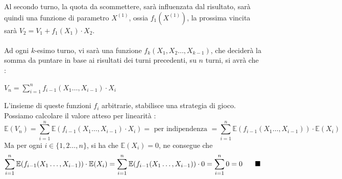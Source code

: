 \documentclass[12pt, letterpaper]{article}
\newcommand{\E}{{\mathbb E}}
\newcommand{\acc}{\\\hphantom{}\\}
\begin{document}
Al secondo turno, la quota da scommettere, 
sarà influenzata dal risultato, sarà quindi una funzione di parametro \(X^{(1)}\), ossia \(f_1(X^{(1)})\), 
la prossima vincita sarà \(V_2=V_1+f_1(X_1)\cdot X_2\).\acc 
Ad ogni \(k\)-esimo turno, vi sarà una funzione \(f_k(X_1,X_2\dots,X_{k-1})\), che deciderà la somma da 
puntare in base ai risultati dei turni precedenti, su \(n\) turni, si avrà che : \begin{center}
    \(V_n=\displaystyle\sum_{i=1}^n f_{i-1}(X_1\dots,X_{i-1})\cdot X_i\)
\end{center}
L'insieme di queste funzioni \(f_i\) arbitrarie, stabilisce una strategia di gioco. Possiamo calcolare il valore 
atteso per linearità :
\begin{equation}
    \E(V_n)=\sum_{i=1}^n\E(f_{i-1}(X_1\dots,X_{i-1})\cdot X_i)=\text{ per indipendenza }=\sum_{i=1}^n\E(f_{i-1}(X_1\dots,X_{i-1}))\cdot \E(X_i)
\end{equation}
Ma per ogni \(i\in\{1,2\dots,n\}\), si ha che  \(\E(X_i)=0\), ne consegue che \begin{equation}
    \sum_{i=1}^n\E(f_{i-1}(X_1\dots,X_{i-1}))\cdot \E(X_i)=\sum_{i=1}^n\E(f_{i-1}(X_1\dots,X_{i-1}))\cdot 0 =\sum_{i=1}^n0= 0\text{\hphantom{text}}\blacksquare
\end{equation} 
\end{document}
